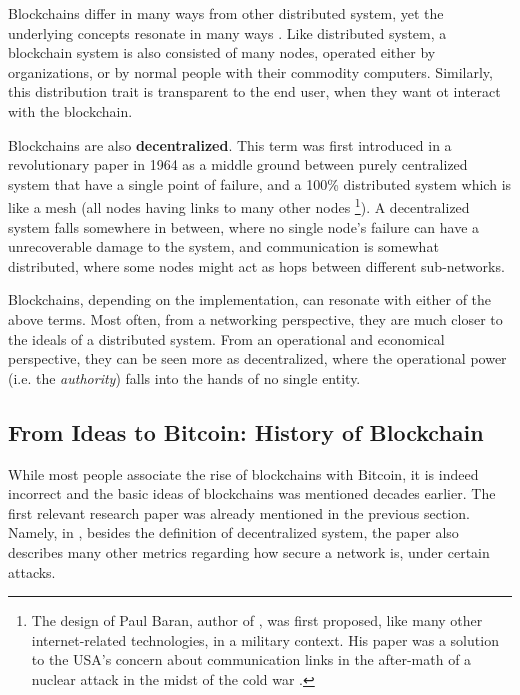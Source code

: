Blockchains differ in many ways from other distributed system, yet the underlying concepts resonate
in many ways \cite{Herlihy_2019}. Like distributed system, a blockchain system is also consisted of
many nodes, operated either by organizations, or by normal people with their commodity computers.
Similarly, this distribution trait is transparent to the end user, when they want ot interact with
the blockchain.

Blockchains are also \textbf{decentralized}. This term was first introduced in a revolutionary paper
in 1964 as a middle ground between purely centralized system that have a single point of failure,
and a 100\% distributed system which is like a mesh (all nodes having links to many other nodes
\cite{on_distributed_comm_networks_1964} \footnote{The design of Paul Baran, author of
\cite{on_distributed_comm_networks_1964}, was first proposed, like many other internet-related
technologies, in a military context. His paper was a solution to the USA's concern about
communication links in the after-math of a nuclear attack in the midst of the cold war
\cite{paul_baran_cold_war}.}). A decentralized system falls somewhere in between, where no single
node's failure can have a unrecoverable damage to the system, and communication is somewhat
distributed, where some nodes might act as hops between different sub-networks.

Blockchains, depending on the implementation, can resonate with either of the above terms. Most
often, from a networking perspective, they are much closer to the ideals of a distributed system.
From an operational and economical perspective, they can be seen more as decentralized, where the
operational power (i.e. the \textit{authority}) falls into the hands of no single entity.


\subsection{From Ideas to Bitcoin: History of Blockchain} \label{chap_bg_:subsec:hisotry}

While most people associate the rise of blockchains with Bitcoin, it is indeed incorrect and the
basic ideas of blockchains was mentioned decades earlier. The first relevant research paper was
already mentioned in the previous section. Namely, in \cite{on_distributed_comm_networks_1964},
besides the definition of decentralized system, the paper also describes many other metrics
regarding how secure a network is, under certain attacks.

